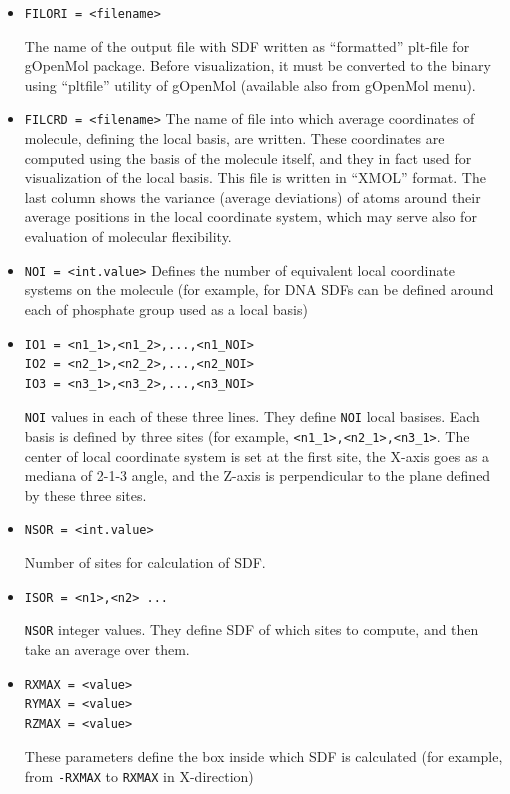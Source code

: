 \documentclass{article}
\begin{document}
\begin{itemize}

\item
\verb|FILORI = <filename>|

The name of the output file with SDF written as ``formatted'' plt-file
for gOpenMol package. Before visualization, it must be converted to the
binary using ``pltfile'' utility of gOpenMol (available also from gOpenMol 
menu).

\item
\verb|FILCRD = <filename>| 
The name of file into which average coordinates of molecule, defining the
local basis, are written. These coordinates are computed using the basis of
the molecule itself, and they in fact used for visualization of the local
basis. This file is written in ``XMOL'' format. The last column shows the
variance (average deviations) of atoms around their average positions in
the local coordinate system, which may serve also for evaluation of molecular
flexibility.

\item
\verb|NOI = <int.value>|
Defines the number of equivalent local coordinate systems on the molecule
(for example, for DNA SDFs can be defined around each of phosphate group 
used as a local basis)

\item
\begin{verbatim}
IO1 = <n1_1>,<n1_2>,...,<n1_NOI>
IO2 = <n2_1>,<n2_2>,...,<n2_NOI>
IO3 = <n3_1>,<n3_2>,...,<n3_NOI>
\end{verbatim}

\verb|NOI| values in each of these three lines. They define \verb|NOI|
local basises. Each basis is defined by three sites (for example,
\verb|<n1_1>,<n2_1>,<n3_1>|. The center of local coordinate system is set
at the first site, the X-axis goes as a mediana of 2-1-3 angle, and the
Z-axis is perpendicular to the plane defined by these three sites.

\item
\verb|NSOR = <int.value>|

Number of sites for calculation of SDF. 

\item
\verb|ISOR = <n1>,<n2> ...|

\verb|NSOR| integer values. They define SDF of which sites to compute,
and then take an average over them. 

\item
\begin{verbatim}
RXMAX = <value> 
RYMAX = <value> 
RZMAX = <value> 
\end{verbatim}
These parameters define the box inside which SDF is calculated
(for example, from \verb|-RXMAX| to \verb|RXMAX| in X-direction)


\end{itemize}
\end{document}
